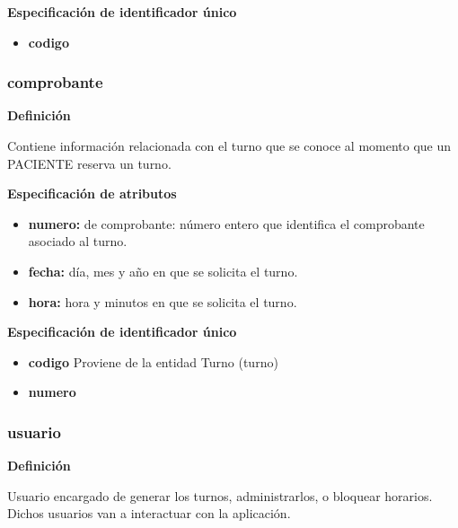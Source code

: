 \documentclass[a4paper,11pt]{article}
\begin{document}
\textbf{Especificación de identificador único}

\begin{itemize}

     \item \textbf{codigo}

\end{itemize}

\subsubsection{\textbf{comprobante}}

\textbf{Definición}

Contiene información relacionada con el turno que se conoce al momento que un 
PACIENTE reserva un turno.

\textbf{Especificación de atributos}

\begin{itemize}

     \item \textbf{numero:} de comprobante: número entero que identifica el comprobante asociado 
     al turno.

     \item \textbf{fecha:} día, mes y año en que se solicita el turno.

     \item \textbf{hora:} hora y minutos en que se solicita el turno.

\end{itemize}

\textbf{Especificación de identificador único}

\begin{itemize}

     \item \textbf{codigo} Proviene de la entidad Turno (turno)

     \item \textbf{numero}

\end{itemize}

\subsubsection{\textbf{usuario}}

\textbf{Definición}

Usuario encargado de generar los turnos, administrarlos, o bloquear horarios.
Dichos usuarios van a interactuar con la aplicación.
\end{document}
